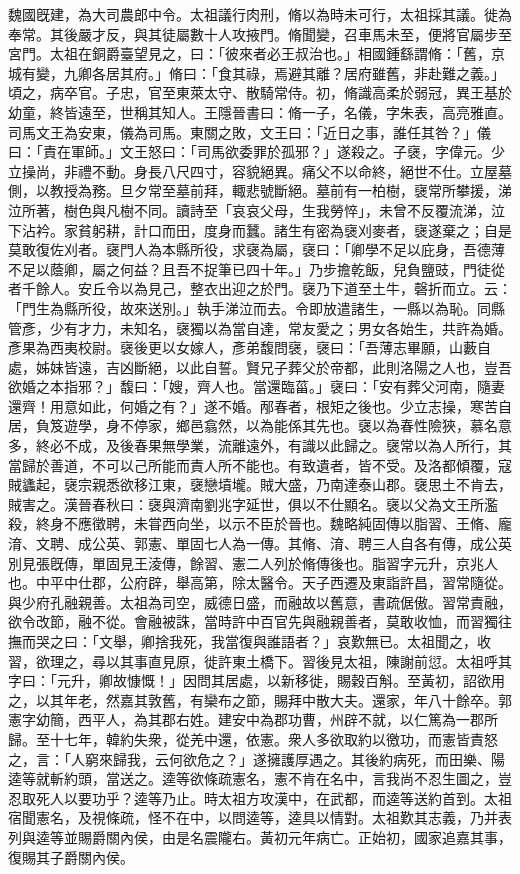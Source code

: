 \begin{pinyinscope}
魏國旣建，為大司農郎中令。太祖議行肉刑，脩以為時未可行，太祖採其議。徙為奉常。其後嚴才反，與其徒屬數十人攻掖門。脩聞變，召車馬未至，便將官屬步至宮門。太祖在銅爵臺望見之，曰：「彼來者必王叔治也。」相國鍾繇謂脩：「舊，京城有變，九卿各居其府。」脩曰：「食其祿，焉避其離？居府雖舊，非赴難之義。」頃之，病卒官。子忠，官至東萊太守、散騎常侍。初，脩識高柔於弱冠，異王基於幼童，終皆遠至，世稱其知人。王隱晉書曰：脩一子，名儀，字朱表，高亮雅直。司馬文王為安東，儀為司馬。東關之敗，文王曰：「近日之事，誰任其咎？」儀曰：「責在軍師。」文王怒曰：「司馬欲委罪於孤邪？」遂殺之。子襃，字偉元。少立操尚，非禮不動。身長八尺四寸，容貌絕異。痛父不以命終，絕世不仕。立屋墓側，以教授為務。旦夕常至墓前拜，輙悲號斷絕。墓前有一柏樹，襃常所攀援，涕泣所著，樹色與凡樹不同。讀詩至「哀哀父母，生我勞悴」，未曾不反覆流涕，泣下沾衿。家貧躬耕，計口而田，度身而蠶。諸生有密為襃刈麥者，襃遂棄之；自是莫敢復佐刈者。襃門人為本縣所役，求襃為屬，襃曰：「卿學不足以庇身，吾德薄不足以蔭卿，屬之何益？且吾不捉筆已四十年。」乃步擔乾飯，兒負鹽豉，門徒從者千餘人。安丘令以為見己，整衣出迎之於門。襃乃下道至土牛，磬折而立。云：「門生為縣所役，故來送別。」執手涕泣而去。令即放遣諸生，一縣以為恥。同縣管彥，少有才力，未知名，襃獨以為當自達，常友愛之；男女各始生，共許為婚。彥果為西夷校尉。襃後更以女嫁人，彥弟馥問襃，襃曰：「吾薄志畢願，山藪自處，姊妹皆遠，吉凶斷絕，以此自誓。賢兄子葬父於帝都，此則洛陽之人也，豈吾欲婚之本指邪？」馥曰：「嫂，齊人也。當還臨菑。」襃曰：「安有葬父河南，隨妻還齊！用意如此，何婚之有？」遂不婚。邴春者，根矩之後也。少立志操，寒苦自居，負笈遊學，身不停家，鄉邑翕然，以為能係其先也。襃以為春性險狹，慕名意多，終必不成，及後春果無學業，流離遠外，有識以此歸之。襃常以為人所行，其當歸於善道，不可以己所能而責人所不能也。有致遺者，皆不受。及洛都傾覆，寇賊蠭起，襃宗親悉欲移江東，襃戀墳壠。賊大盛，乃南達泰山郡。襃思土不肯去，賊害之。漢晉春秋曰：襃與濟南劉兆字延世，俱以不仕顯名。襃以父為文王所濫殺，終身不應徵聘，未甞西向坐，以示不臣於晉也。魏略純固傳以脂習、王脩、龐淯、文聘、成公英、郭憲、單固七人為一傳。其脩、淯、聘三人自各有傳，成公英別見張旣傳，單固見王淩傳，餘習、憲二人列於脩傳後也。脂習字元升，京兆人也。中平中仕郡，公府辟，舉高第，除太醫令。天子西遷及東詣許昌，習常隨從。與少府孔融親善。太祖為司空，威德日盛，而融故以舊意，書疏倨傲。習常責融，欲令改節，融不從。會融被誅，當時許中百官先與融親善者，莫敢收恤，而習獨往撫而哭之曰：「文舉，卿捨我死，我當復與誰語者？」哀歎無已。太祖聞之，收習，欲理之，尋以其事直見原，徙許東土橋下。習後見太祖，陳謝前愆。太祖呼其字曰：「元升，卿故慷慨！」因問其居處，以新移徙，賜穀百斛。至黃初，詔欲用之，以其年老，然嘉其敦舊，有欒布之節，賜拜中散大夫。還家，年八十餘卒。郭憲字幼簡，西平人，為其郡右姓。建安中為郡功曹，州辟不就，以仁篤為一郡所歸。至十七年，韓約失衆，從羌中還，依憲。衆人多欲取約以徼功，而憲皆責怒之，言：「人窮來歸我，云何欲危之？」遂擁護厚遇之。其後約病死，而田樂、陽逵等就斬約頭，當送之。逵等欲條疏憲名，憲不肯在名中，言我尚不忍生圖之，豈忍取死人以要功乎？逵等乃止。時太祖方攻漢中，在武都，而逵等送約首到。太祖宿聞憲名，及視條疏，怪不在中，以問逵等，逵具以情對。太祖歎其志義，乃并表列與逵等並賜爵關內侯，由是名震隴右。黃初元年病亡。正始初，國家追嘉其事，復賜其子爵關內侯。


\end{pinyinscope}